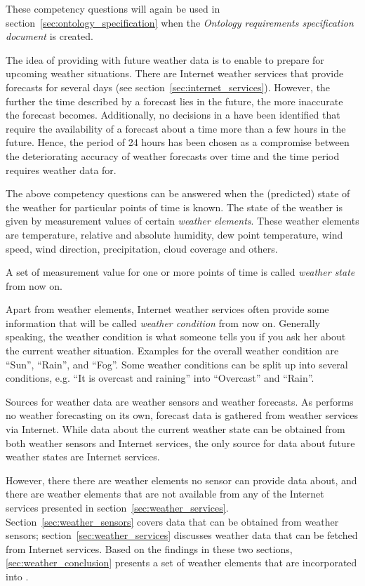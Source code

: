 These competency questions will again be used in section~\ref{sec:ontology_specification} when the \emph{Ontology requirements specification document} is created.

The idea of providing \thinkhome with future weather data is to enable \thinkhome to prepare for upcoming weather situations. There are Internet weather services that provide forecasts for several days (see section~\ref{sec:internet_services}). However, the further the time described by a forecast lies in the future, the more inaccurate the forecast becomes\cite{forecast_error1,forecast_error2}. Additionally, no decisions in a \smarthome have been identified that require the availability of a forecast about a time more than a few hours in the future. Hence, the period of 24 hours has been chosen as a compromise between the deteriorating accuracy of weather forecasts over time and the time period \thinkhome requires weather data for.

The above competency questions can be answered when the (predicted) state of the weather for particular points of time is known. The state of the weather is given by measurement values of certain \emph{weather elements}. These weather elements are temperature, relative and absolute humidity, dew point temperature, wind speed, wind direction, precipitation, cloud coverage and others.\cite{GlossaryOfMeteorology}

A set of measurement value for one or more points of time is called \emph{weather state} from now on.

Apart from weather elements, Internet weather services often provide some information that will be called \emph{weather condition} from now on. Generally speaking, the weather condition is what someone tells you if you ask her about the current weather situation. Examples for the overall weather condition are ``Sun'', ``Rain'', and ``Fog''. Some weather conditions can be split up into several conditions, e.g. ``It is overcast and raining'' into ``Overcast'' and ``Rain''.

Sources for weather data are weather sensors and weather forecasts. As \thinkhome performs no weather forecasting on its own, forecast data is gathered from weather services via Internet. While data about the current weather state can be obtained from both weather sensors and Internet services, the only source for data about future weather states are Internet services.

However, there there are weather elements no sensor can provide data about, and there are weather elements that are not available from any of the Internet services presented in section~\ref{sec:weather_services}. Section~\ref{sec:weather_sensors} covers data that can be obtained from weather sensors; section~\ref{sec:weather_services} discusses weather data that can be fetched from Internet services. Based on the findings in these two sections, \ref{sec:weather_conclusion} presents a set of weather elements that are incorporated into \thinkhomeweather.

